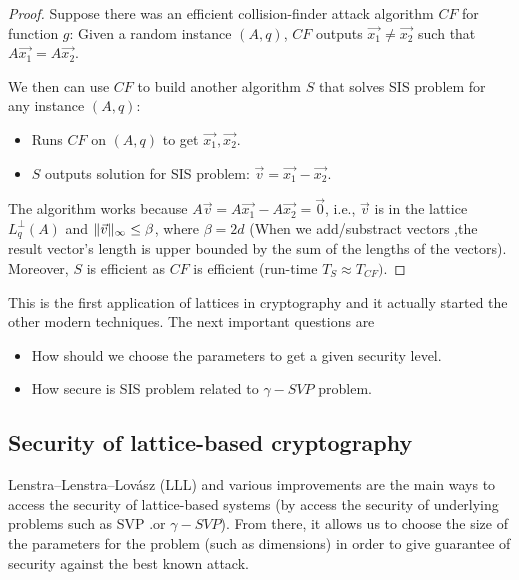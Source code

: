 \begin{proof}
  Suppose there was an efficient collision-finder attack algorithm $CF$ for
  function $g$: Given a random instance $(A,q)$, $CF$ outputs
  $\vec{x_1} \neq \vec{x_2}$ such that $A\vec{x_1} = A\vec{x_2}$.

  We then can use $CF$ to build another algorithm $S$ that solves SIS problem
  for any instance $(A,q)$:
  \begin{itemize}
  \item Runs $CF$ on $(A,q)$ to get $\vec{x_1},\vec{x_2}$.
  \item $S$ outputs solution for SIS problem: $\vec{v} = \vec{x_1} - \vec{x_2}$.
  \end{itemize}

  The algorithm works because $A\vec{v} = A\vec{x_1} - A\vec{x_2} = \vec{0}$,
  i.e., $\vec{v}$ is in the lattice $L_q^\bot(A)$ and
  $\Vert \vec{v} \Vert_{\infty} \leq \beta$, where $\beta = 2d$ (When we add/substract
  vectors ,the result vector's length is upper bounded by the sum of the lengths
  of the vectors). Moreover, $S$ is efficient as $CF$ is efficient (run-time
  $T_S \approx T_{CF})$.
\end{proof}
This is the first application of lattices in cryptography and it actually
started the other modern techniques. The next important questions are
\begin{itemize}
\item How should we choose the parameters to get a given security level.
\item How secure is SIS problem related to $\gamma-SVP$ problem.
\end{itemize}

\subsection{Security of lattice-based cryptography}
\label{sec:latticeSecurity}
Lenstra–Lenstra–Lovász (LLL) and various improvements are the main ways to
access the security of lattice-based systems (by access the security of
underlying problems such as SVP .or $\gamma-SVP$). From there, it allows us to
choose the size of the parameters for the problem (such as dimensions) in order
to give guarantee of security against the best known attack.

